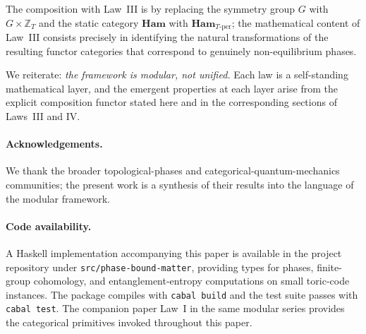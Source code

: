 \documentclass[12pt]{article}
\theoremstyle{plain}
\theoremstyle{definition}
\theoremstyle{remark}
\newcommand{\Ham}{\mathbf{Ham}}
\begin{document}
The composition with Law~III is by replacing the symmetry group $G$ with $G\times
\mathbb{Z}_{T}$ and the static category $\Ham$ with $\Ham_{T\text{-per}}$; the
mathematical content of Law~III consists precisely in identifying the natural
transformations of the resulting functor categories that correspond to genuinely
non-equilibrium phases.

We reiterate: \emph{the framework is modular, not unified.} Each law is a self-standing
mathematical layer, and the emergent properties at each layer arise from the explicit
composition functor stated here and in the corresponding sections of Laws~III and IV.

\bigskip

\paragraph{Acknowledgements.}
We thank the broader topological-phases and categorical-quantum-mechanics communities;
the present work is a synthesis of their results into the language of the modular
framework.

\paragraph{Code availability.}
A Haskell implementation accompanying this paper is available in the project
repository under \texttt{src/phase-bound-matter}, providing types for phases,
finite-group cohomology, and entanglement-entropy computations on small toric-code
instances. The package compiles with \texttt{cabal build} and the test suite passes
with \texttt{cabal test}. The companion paper Law~I in the same modular series
\cite{LawI} provides the categorical primitives invoked throughout this paper.
\end{document}
